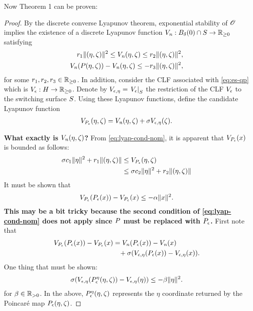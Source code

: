 \documentclass[twocolumn]{article}
\begin{document}
Now Theorem 1 can be proven:
\begin{proof}
  By the discrete converse Lyapunov theorem, exponential stability of $\Orbit$ implies the existence of a discrete Lyapunov function $\Vn : B_{\delta}(0) \cap \S \to \Rnn$ satisfying
  \begin{align}
    \nonumber
    r_{1} \| (\eta, \zeta) \|^{2} \leq \Vn(\eta, \zeta) \leq r_{2} \| (\eta, \zeta) \|^2,\\
    \Vn(\P(\eta, \zeta)) - \Vn(\eta, \zeta) \leq -r_{3} \| (\eta, \zeta) \|^{2},
    \label{eq:lyap-cond-nom}
  \end{align}
  for some $r_{1}, r_{2}, r_{3} \in \Rnn$.
  In addition, consider the CLF associated with \eqref{eq:es-qp} which is $\Ve : \Eta \to \Rnn$.
  Denote by $\Vee = \VeS$ the restriction of the CLF $\Ve$ to the switching surface $\S$.
  Using these Lyapunov functions, define the candidate Lyapunov function
  \begin{align}
    \VP(\eta, \zeta) = \Vn(\eta, \zeta) + \sigma \Vee(\zeta).
  \end{align}

  {\bf What exactly is $\Vn(\eta, \zeta)$?}
  From \eqref{eq:lyap-cond-nom}, it is apparent that $\VP(x)$ is bounded as follows:
  \begin{align}
    \sigma c_{1} \| \eta \|^{2} + r_{1} \| (\eta, \zeta) \| &\leq \VP(\eta, \zeta)\\
    \nonumber
    &\leq \sigma c_{2} \| \eta \|^{2} + r_{2} \| (\eta, \zeta) \|
  \end{align}
  It must be shown that
  \begin{align}
    \VP(\Pe(x)) - \VP(x) \leq -\alpha \| x \|^{2}.
  \end{align}
      {\bf This may be a bit tricky because the second condition of \eqref{eq:lyap-cond-nom} does not apply since $\P$ must be replaced with $\Pe$.}
  First note that
  \begin{align}
    \VP(\Pe(x)) - \VP(x) = \Vn(\Pe(x)) - \Vn(x) \hspace{1.2cm}\\
    \nonumber
    \mbox{} + \sigma(\Vee(\Pe(x)) - \Vee(x)).
  \end{align}
  One thing that must be shown:
  \begin{align}
    \sigma(\Vee(\Pe^{\eta}(\eta, \zeta)) - \Vee(\eta)) \leq -\beta \| \eta \|^{2}.
  \end{align}
  for $\beta \in \Rpd$.
  In the above, $\Pe^{\eta}(\eta, \zeta)$ represents the $\eta$ coordinate returned by the Poincar{\'e} map $\Pe(\eta, \zeta)$.
\end{proof}
\end{document}
